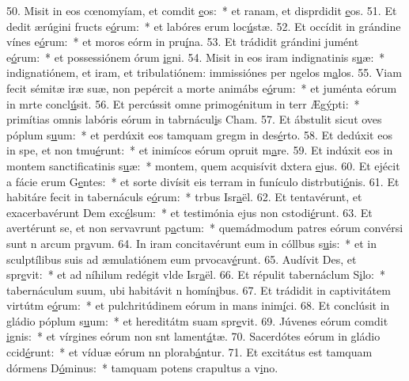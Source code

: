 50. Misit in eos cœnomyíam, et comdit \uline{e}os:~* et ranam, et disprdidit \uline{e}os.
51. Et dedit ærúgini fructs e\uline{ó}rum:~* et labóres erum loc\uline{ú}stæ.
52. Et occídit in grándine vínes e\uline{ó}rum:~* et moros eórm in pru\uline{í}na.
53. Et trádidit grándini jumént e\uline{ó}rum:~* et possessiónem órum \uline{i}gni.
54. Misit in eos iram indignatinis s\uline{u}æ:~* indignatiónem, et iram, et tribulatiónem: immissiónes per ngelos m\uline{a}los.
55. Viam fecit sémitæ iræ suæ, non pepércit a morte animábs e\uline{ó}rum:~* et juménta eórum in mrte concl\uline{ú}sit.
56. Et percússit omne primogénitum in terr Æg\uline{ý}pti:~* primítias omnis labóris eórum in tabrnácul\uline{i}s Cham.
57. Et ábstulit sicut oves póplum s\uline{u}um:~* et perdúxit eos tamquam gregm in des\uline{é}rto.
58. Et dedúxit eos in spe, et non tmu\uline{é}runt:~* et inimícos eórum opruit m\uline{a}re.
59. Et indúxit eos in montem sanctificatinis s\uline{u}æ:~* montem, quem acquisívit dxtera \uline{e}jus.
60. Et ejécit a fácie erum G\uline{e}ntes:~* et sorte divísit eis terram in funículo distrbuti\uline{ó}nis.
61. Et habitáre fecit in tabernáculs e\uline{ó}rum:~* trbus Isr\uline{a}ël.
62. Et tentavérunt, et exacerbavérunt Dem exc\uline{é}lsum:~* et testimónia ejus non cstodi\uline{é}runt.
63. Et avertérunt se, et non servavrunt p\uline{a}ctum:~* quemádmodum patres eórum convérsi sunt n arcum pr\uline{a}vum.
64. In iram concitavérunt eum in cóllbus s\uline{u}is:~* et in sculptílibus suis ad æmulatiónem eum prvocav\uline{é}runt.
65. Audívit Des, et spr\uline{e}vit:~* et ad níhilum redégit vlde Isr\uline{a}ël.
66. Et répulit tabernáclum S\uline{i}lo:~* tabernáculum suum, ubi habitávit n homín\uline{i}bus.
67. Et trádidit in captivitátem virtútm e\uline{ó}rum:~* et pulchritúdinem eórum in mans inim\uline{í}ci.
68. Et conclúsit in gládio póplum s\uline{u}um:~* et hereditátm suam spr\uline{e}vit.
69. Júvenes eórum comdit \uline{i}gnis:~* et vírgines eórum non snt lament\uline{á}tæ.
70. Sacerdótes eórum in gládio ccid\uline{é}runt:~* et víduæ eórum nn plorab\uline{á}ntur.
71. Et excitátus est tamquam dórmens D\uline{ó}minus:~* tamquam potens crapultus a v\uline{i}no.
